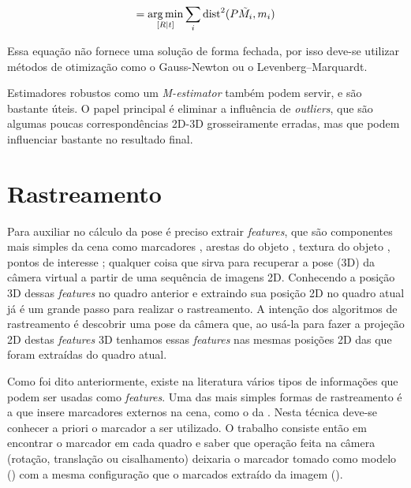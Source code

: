 \begin{equation}
[R | t] = \argmin_{[R | t]} \sum_i \text{dist}^2(P\tilde{M_i}, m_i)
\end{equation}

Essa equação não fornece uma solução de forma fechada, por isso deve-se utilizar métodos de otimização como o Gauss-Newton ou o Levenberg–Marquardt.

Estimadores robustos como um \emph{M-estimator} também podem servir, e são bastante úteis. O papel principal é eliminar a influência de \emph{outliers}, que são algumas poucas correspondências 2D-3D grosseiramente erradas, mas que podem influenciar bastante no resultado final.

\section{Rastreamento}

Para auxiliar no cálculo da pose é preciso extrair \emph{features}, que são componentes mais simples da cena como marcadores \cite{ref_marcadores}, arestas do objeto \cite{ref_arestas}, textura do objeto \cite{ref_textura}, pontos de interesse \cite{ref_pontosdeinteresse}; qualquer coisa que sirva para recuperar a pose (3D) da câmera virtual a partir de uma sequência de imagens 2D. Conhecendo a posição 3D dessas \emph{features} no quadro anterior e extraindo sua posição 2D no quadro atual já é um grande passo para realizar o rastreamento. A intenção dos algoritmos de rastreamento é descobrir uma pose da câmera que, ao usá-la para fazer a projeção 2D destas \emph{features} 3D tenhamos essas \emph{features} nas mesmas posições 2D das que foram extraídas do quadro atual.

Como foi dito anteriormente, existe na literatura vários tipos de informações que podem ser usadas como \emph{features}. Uma das mais simples formas de rastreamento é a que insere marcadores externos na cena, como o da . Nesta técnica deve-se conhecer a priori o marcador a ser utilizado. O trabalho consiste então em encontrar o marcador em cada quadro e saber que operação feita na câmera (rotação, translação ou cisalhamento) deixaria o marcador tomado como modelo () com a mesma configuração que o marcados extraído da imagem ().

